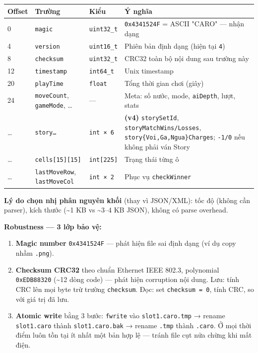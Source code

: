 \documentclass[11pt,a4paper]{article}
\begin{document}
\begin{center}
\begin{tabularx}{\textwidth}{lllX}
Offset & Trường & Kiểu & Ý nghĩa\\
\hline
0 & \texttt{magic} & \texttt{uint32\_t} & \texttt{0x4341524F} = ASCII "CARO" — nhận dạng\\
4 & \texttt{version} & \texttt{uint16\_t} & Phiên bản định dạng (hiện tại \texttt{4})\\
8 & \texttt{checksum} & \texttt{uint32\_t} & CRC32 toàn bộ nội dung sau trường này\\
12 & \texttt{timestamp} & \texttt{int64\_t} & Unix timestamp\\
20 & \texttt{playTime} & \texttt{float} & Tổng thời gian chơi (giây)\\
24 & \texttt{moveCount}, \texttt{gameMode}, … & — & Meta: số nước, mode, \texttt{aiDepth}, lượt, stats\\
… & \texttt{story\ldots} & \texttt{int × 6} & \textbf{(v4)} \texttt{storySetId}, \texttt{storyMatchWins/Losses}, \texttt{story\{Voi,Ga,Ngua\}Charges}; \texttt{-1/0} nếu không phải ván Story\\
… & \texttt{cells[15][15]} & \texttt{int[225]} & Trạng thái từng ô\\
… & \texttt{lastMoveRow}, \texttt{lastMoveCol} & \texttt{int × 2} & Phục vụ \texttt{checkWinner}\\
\end{tabularx}
\end{center}

\textbf{Lý do chọn nhị phân nguyên khối} (thay vì JSON/XML): tốc độ (không cần parser), kích thước (\textasciitilde{}1 KB vs \textasciitilde{}3–4 KB JSON), không có parse overhead.

\textbf{Robustness — 3 lớp bảo vệ:}

\begin{enumerate}
\item \textbf{Magic number} \texttt{0x4341524F} — phát hiện file sai định dạng (ví dụ copy nhầm \texttt{.png}).
\item \textbf{Checksum CRC32} theo chuẩn Ethernet IEEE 802.3, polynomial \texttt{0xEDB88320} (\textasciitilde{}12 dòng code) — phát hiện corruption nội dung. Lưu: tính CRC lên mọi byte trừ trường \texttt{checksum}. Đọc: set \texttt{checksum = 0}, tính CRC, so với giá trị đã lưu.
\item \textbf{Atomic write} bằng 3 bước: \texttt{fwrite} vào \texttt{slot1.caro.tmp} → rename \texttt{slot1.caro} thành \texttt{slot1.caro.bak} → rename \texttt{.tmp} thành \texttt{.caro}. Ở mọi thời điểm luôn tồn tại ít nhất một bản hợp lệ — tránh file cụt nửa chừng khi mất điện.
\end{enumerate}
\end{document}
